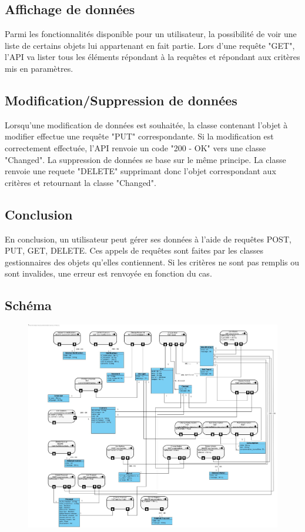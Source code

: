 \subsection{Affichage de données}
\begin{flushleft}
Parmi les fonctionnalités disponible pour un utilisateur, la possibilité de voir une liste de certains objets lui appartenant en fait partie. Lors d'une requête "GET", l'API va lister tous les éléments répondant à la requêtes et répondant aux critères mis en paramètres.
\end{flushleft}

\subsection{Modification/Suppression de données}
\begin{flushleft}
Lorsqu'une modification de données est souhaitée, la classe contenant l'objet à modifier effectue une requête "PUT" correspondante. Si la modification est correctement effectuée, l'API renvoie un code "200 - OK" vers une classe "Changed". La suppression de données se base sur le même principe. La classe renvoie une requete "DELETE" supprimant donc l'objet correspondant aux critères et retournant la classe "Changed".
\end{flushleft}

\subsection{Conclusion}
\begin{flushleft}
En conclusion, un utilisateur peut gérer ses données à l'aide de requêtes POST, PUT, GET, DELETE. Ces appels de requêtes sont faites par les classes gestionnaires des objets qu'elles contiennent. Si les critères ne sont pas remplis ou sont invalides, une erreur est renvoyée en fonction du cas.
\newpage

\end{flushleft}
\subsection{Schéma}
\begin{figure}[h]
\includegraphics[scale=0.2]{Base/apirest/img/apirest.jpg}
\end{figure}

